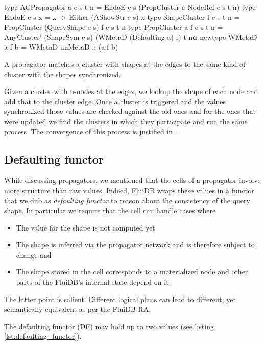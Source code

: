 \begin{code}
  \begin{haskellcode}
    type ACPropagator a e s t n =
      EndoE e s (PropCluster a NodeRef e s t n)
    type EndoE e s x = x -> Either (AShowStr e s) x
    type ShapeCluster f e s t n = PropCluster (QueryShape e s) f e s t n
    type PropCluster a f e s t n =
      AnyCluster' (ShapeSym e s) (WMetaD (Defaulting a) f) t nω
    newtype WMetaD a f b = WMetaD { unMetaD :: (a,f b)}
  \end{haskellcode}
  \caption{\label{lst:acpropagator}A propagator matches a cluster with
    shapes at the edges to the same kind of cluster with the shapes
    synchronized.}
\end{code}

Given a cluster with n-nodes at the edges, we lookup the shape of each
node and add that to the cluster edge.
Once a cluster is triggered and the values synchronized those values
are checked against the old ones and for the ones that were updated we
find the clusters in which they participate and run the same
process. The convergence of this process is justified in \cite{kuperLVarsLatticebasedData2013}.

\subsection{Defaulting functor}

While discussing propagators, we mentioned that the cells of a
propagator involve more structure than raw values. Indeed, FluiDB
wraps these values in a functor that we dub as \emph{defaulting
  functor} to reason about the consistency of the query shape. In
particular we require that the cell can handle cases where
\begin{itemize}
\item The value for the shape is not computed yet
\item The shape is inferred via the propagator network and is therefore subject to change and
\item The shape stored in the cell corresponds to a materialized node and other
parts of the FluiDB's internal state depend on it.
\end{itemize}

The latter point is salient. Different logical plans can lead to different, yet
semantically equivalent as per the FluiDB RA.

The defaulting functor (DF) may hold up to two values (see listing
\ref{lst:defaulting_functor}).

